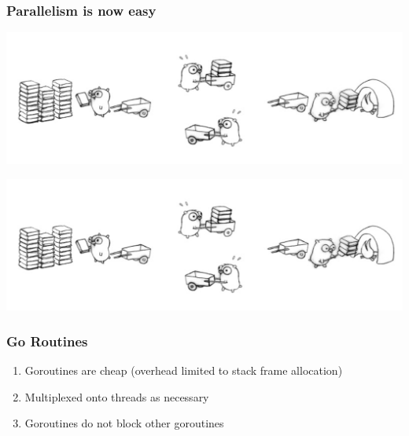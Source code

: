 \documentclass[xelatex,aspectratio=169]{beamer}
\begin{document}
\begin{frame}
	\frametitle{Parallelism is now easy}
	\centerline{\includegraphics{images/gophercomplex1.jpg}}
	\centerline{\includegraphics{images/gophercomplex1.jpg}}
\end{frame}

% 

\begin{frame}
	\frametitle{Go Routines}
	\begin{enumerate}
		\item<1> Goroutines are cheap (overhead limited to stack frame allocation)
		\item<2> Multiplexed onto threads as necessary
		\item<3> Goroutines do not block other goroutines
	\end{enumerate}
\end{frame}
\end{document}
